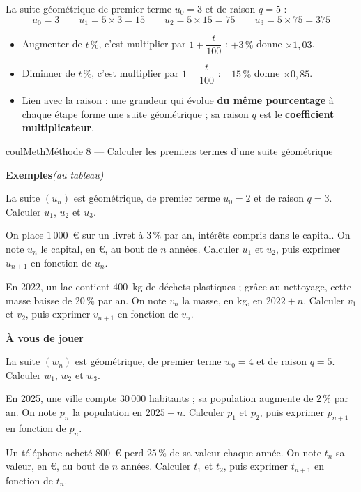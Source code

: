 \documentclass[11pt,a4paper]{article}
\makeatletter
\newcounter{lycee@signet}
\newcommand{\signet}[3][]{\stepcounter{lycee@signet}%
  \edef\lycee@dest{\if\relax\detokenize{#1}\relax
    signet.\arabic{lycee@signet}\else#1\fi}%
  \hypertarget{\lycee@dest}{}\bookmark[level=#2,dest=\lycee@dest]{#3}}
\newcounter{methode}
\newenvironment{methodebox}[1][Méthode]{\stepcounter{methode}%
  \begin{boitecours}[phantom={\signet[methode-\arabic{methode}]{2}{#1}}]{coulMeth}{#1}}%
  {\end{boitecours}}
\newcommand{\etape}[1]{\par\smallskip\textbf{\color{coulMeth}#1}\par\nobreak\smallskip}
\newcommand{\autableau}{\hfill{\footnotesize\itshape\color{black!45}(au tableau)}}
\newcommand{\etapeexemples}{%
    \par\smallskip\textbf{\color{coulMeth}Exemples}\autableau\par\nobreak\smallskip}
\makeatother
\begin{document}
\begin{exemplebox}[Exemple]
La suite géométrique de premier terme $u_{0}=3$ et de raison $q=5$ :
\[
  u_{0}=3 \qquad u_{1}=5\times 3=15 \qquad u_{2}=5\times 15=75 \qquad
  u_{3}=5\times 75=375
\]
\end{exemplebox}

\begin{remarquebox}
\begin{itemize}
  \item Augmenter de $t\,\%$, c'est multiplier par $1+\dfrac{t}{100}$ : $+3\,\%$ donne
        $\times 1{,}03$.
  \item Diminuer de $t\,\%$, c'est multiplier par $1-\dfrac{t}{100}$ : $-15\,\%$ donne
        $\times 0{,}85$.
  \item Lien avec la raison : une grandeur qui évolue \textbf{du même pourcentage} à
        chaque étape forme une suite géométrique ; sa raison $q$ est le
        \textbf{coefficient multiplicateur}.
\end{itemize}
\end{remarquebox}

\begin{methodebox}[Méthode 8 --- Calculer les premiers termes d'une suite géométrique]
\etapeexemples
\begin{questions}[label=\alph*)]
  \item La suite $(u_{n})$ est géométrique, de premier terme $u_{0}=2$ et de raison
        $q=3$. Calculer $u_{1}$, $u_{2}$ et $u_{3}$.
  \item On place $1\,000$~€ sur un livret à $3\,\%$ par an, intérêts compris dans le
        capital. On note $u_{n}$ le capital, en €, au bout de $n$ années. Calculer
        $u_{1}$ et $u_{2}$, puis exprimer $u_{n+1}$ en fonction de $u_{n}$.
  \item En 2022, un lac contient $400$~kg de déchets plastiques ; grâce au nettoyage,
        cette masse baisse de $20\,\%$ par an. On note $v_{n}$ la masse, en kg, en
        $2022+n$. Calculer $v_{1}$ et $v_{2}$, puis exprimer $v_{n+1}$ en fonction de
        $v_{n}$.
\end{questions}

\etape{À vous de jouer}
\begin{questions}
  \item La suite $(w_{n})$ est géométrique, de premier terme $w_{0}=4$ et de raison
        $q=5$. Calculer $w_{1}$, $w_{2}$ et $w_{3}$.
  \item En 2025, une ville compte $30\,000$ habitants ; sa population augmente de
        $2\,\%$ par an. On note $p_{n}$ la population en $2025+n$. Calculer $p_{1}$ et
        $p_{2}$, puis exprimer $p_{n+1}$ en fonction de $p_{n}$.
  \item Un téléphone acheté $800$~€ perd $25\,\%$ de sa valeur chaque année. On note
        $t_{n}$ sa valeur, en €, au bout de $n$ années. Calculer $t_{1}$ et $t_{2}$,
        puis exprimer $t_{n+1}$ en fonction de $t_{n}$.
\end{questions}

\end{methodebox}
\end{document}
